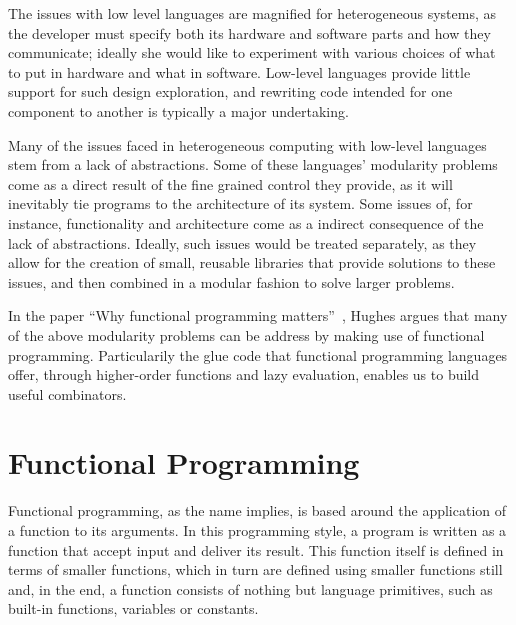 \documentclass[../main.tex]{subfiles}
\begin{document}
The issues with low level languages are magnified for heterogeneous systems, as the developer must specify both its hardware and software parts and how they communicate; ideally she would like to experiment with various choices of what to put in hardware and what in software. Low-level languages provide little support for such design exploration, and rewriting code intended for one component to another is typically a major undertaking.

Many of the issues faced in heterogeneous computing with low-level languages stem from a lack of abstractions. Some of these languages' modularity problems come as a direct result of the fine grained control they provide, as it will inevitably tie programs to the architecture of its system. Some issues of, for instance, functionality and architecture come as a indirect consequence of the lack of abstractions. Ideally, such issues would be treated separately, as they allow for the creation of small, reusable libraries that provide solutions to these issues, and then combined in a modular fashion to solve larger problems.



In the paper ``Why functional programming matters''~\cite{hughes1989}, Hughes argues that many of the above modularity problems can be address by making use of functional programming. Particularily the glue code that functional programming languages offer, through higher-order functions and lazy evaluation, enables us to build useful combinators.

\section{Functional Programming}
\label{functional}

Functional programming, as the name implies, is based around the application of a function to its arguments. In this programming style, a program is written as a function that accept input and deliver its result. This function itself is defined in terms of smaller functions, which in turn are defined using smaller functions still and, in the end, a function consists of nothing but language primitives, such as built-in functions, variables or constants.
\end{document}
